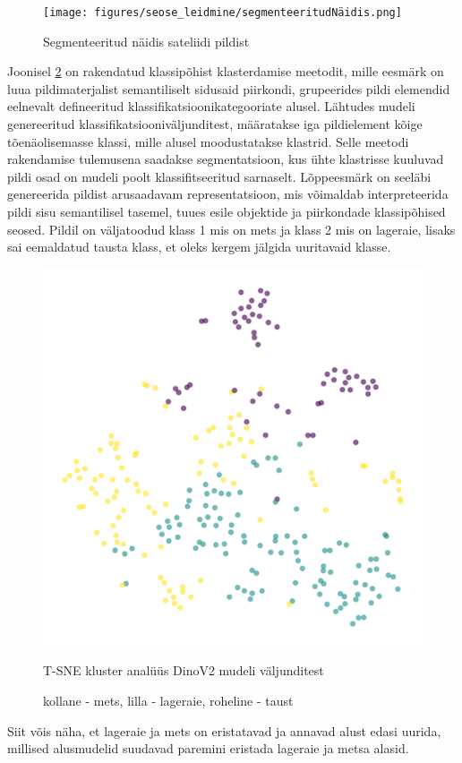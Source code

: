 \begin{figure}[H]
    \centering
    \texttt{[image: figures/seose\_leidmine/segmenteeritudNäidis.png]}
    \caption{Segmenteeritud näidis sateliidi pildist}
    \label{fig:segmenteeritudPealiskiht}
\end{figure}

Joonisel \ref{fig:tsneDinoPatchEmbedings} on rakendatud klassipõhist klasterdamise meetodit, mille eesmärk on luua
pildimaterjalist semantiliselt sidusaid piirkondi, grupeerides pildi elemendid
eelnevalt defineeritud klassifikatsioonikategooriate alusel. Lähtudes mudeli
genereeritud klassifikatsiooniväljunditest, määratakse iga pildielement kõige
tõenäolisemasse klassi, mille alusel moodustatakse klastrid. Selle meetodi
rakendamise tulemusena saadakse segmentatsioon, kus ühte klastrisse kuuluvad
pildi osad on mudeli poolt klassifitseeritud sarnaselt. Lõppeesmärk on seeläbi
genereerida pildist arusaadavam representatsioon, mis
võimaldab interpreteerida pildi sisu semantilisel tasemel, tuues
esile objektide ja piirkondade klassipõhised seosed. Pildil on väljatoodud klass 1 mis on mets ja klass 2 mis on lageraie, lisaks sai eemaldatud tausta klass, et oleks kergem jälgida uuritavaid klasse.

\begin{figure}[H]
    \centering
    \includegraphics[width=.7\textwidth]{figures/seose_leidmine/tsneDinoPatchEmbedings.png}
    \caption{T-SNE kluster analüüs DinoV2 mudeli väljunditest}
    \caption*{kollane - mets, lilla - lageraie, roheline - taust}
    \label{fig:tsneDinoPatchEmbedings}
\end{figure}

Siit võis näha, et lageraie ja mets on eristatavad ja annavad alust edasi uurida, millised alusmudelid suudavad paremini eristada lageraie ja metsa alasid.
